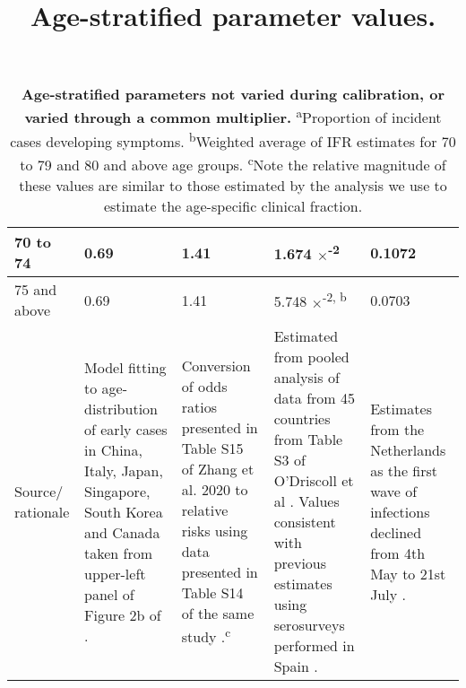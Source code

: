 \begin{table}[ht]
\begin{tabular}[ht]{| p{2cm} | p{2.5cm} | p{3cm} | p{3cm} | p{2.5cm}|}
        \hline
        70 to 74 & 0.69 & 1.41 & 1.674 $\times$\textsuperscript{-2} & 0.1072 \\
        \hline
        75 and above & 0.69 & 1.41 & 5.748 $\times$\textsuperscript{-2, b} & 0.0703 \\
        \hline
        Source/ rationale & 
        Model fitting to age-distribution of early cases in China, Italy, Japan, Singapore, South Korea and Canada taken from upper-left panel of Figure 2b of \cite{RN33}. & 
        Conversion of odds ratios presented in Table S15 of Zhang et al. 2020 to relative risks using data presented in Table S14 of the same study \cite{RN7}.\textsuperscript{c} &
        Estimated from pooled analysis of data from 45 countries from Table S3 of O'Driscoll et al \cite{RN6}. Values consistent with previous estimates using serosurveys performed in Spain \cite{RN21}. &
        Estimates from the Netherlands as the first wave of infections declined from 4th May to 21st July \cite{RN9}. \\ \hline
	\end{tabular}
	\label{age_params}
	\title{Age-stratified parameter values.}
	\caption{\textbf{Age-stratified parameters not varied during calibration, or varied through a common multiplier.} \textsuperscript{a}Proportion of incident cases developing symptoms. \textsuperscript{b}Weighted average of IFR estimates for 70 to 79 and 80 and above age groups. \textsuperscript{c}Note the relative magnitude of these values are similar to those estimated by the analysis we use to estimate the age-specific clinical fraction.}
\end{table}

\clearpage